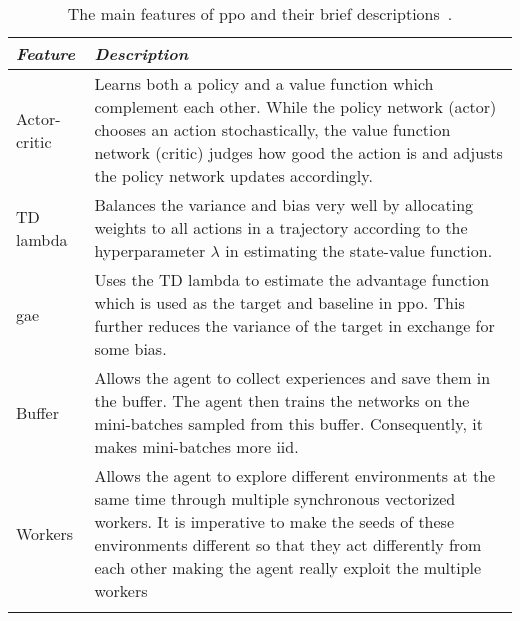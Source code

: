 \documentclass[../main.tex]{subfiles}
\begin{document}
\begin{table}[H]
    \centering
    \caption{The main features of \gls{ppo} and their brief
    descriptions~\cite{ppo}.}
    \label{tab:ppo-features}
    \begin{tabularx}{\textwidth}{ X p{12.3cm} }
        \toprule
            \textit{Feature} 
                & \textit{Description}\\

        \midrule
        Actor-critic
                & 
                Learns both a policy and a value function which
                complement each other. 
                While the policy network (actor) chooses an action
                stochastically, the value function network (critic)
                judges how good the action is and adjusts the policy
                network updates accordingly. 
                \\ \addlinespace
        
        TD lambda
                & 
                Balances the variance and bias very well by allocating
                weights to all actions in a trajectory according to
                the hyperparameter $\lambda$ in estimating the
                state-value function. 
                \\ \addlinespace

        \gls{gae}
                & 
                Uses the TD lambda to estimate the advantage function
                which is used as the target and baseline in \gls{ppo}.
                This further reduces the variance of the target in
                exchange for some bias.
                \\ \addlinespace
        
        Buffer
                & 
                Allows the agent to collect experiences and save them
                in the buffer.
                The agent then trains the networks on the mini-batches
                sampled from this buffer.
                Consequently, it makes mini-batches more \gls{iid}.
                \\ \addlinespace

        Workers
                & 
                Allows the agent to explore different environments at
                the same time through multiple synchronous vectorized
                workers.
                It is imperative to make the seeds of these
                environments different so that they act differently
                from each other making the agent really exploit the
                multiple workers
                \\ \addlinespace
        

\end{tabularx}
\end{table}
\end{document}
